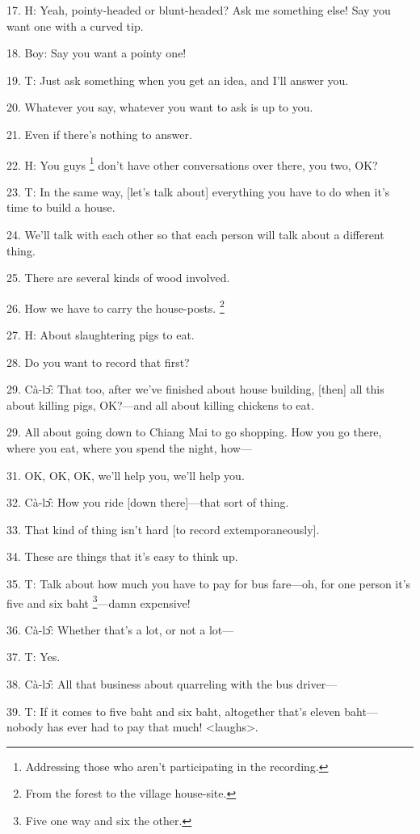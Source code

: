 17. H: Yeah, pointy-headed or blunt-headed?  Ask me something else! Say you want
one with a curved tip.

18. Boy: Say you want a pointy one!

19. T: Just ask something when you get an idea, and I'll answer you.

20. Whatever you say, whatever you want to ask is up to you.

21. Even if there's nothing to answer.

22. H: You guys \footnote{Addressing those who aren't participating in the recording.} don't have other conversations over there, you two, OK?

23. T: In the same way, [let's talk about] everything you have to do when it's
time to build a house.

24. We'll talk with each other so that each person will talk about a different
thing.

25. There are several kinds of wood involved.

26. How we have to carry the house-posts. \footnote{From the forest to the village house-site.}

27. H: About slaughtering pigs to eat.

28. Do you want to record that first?

29. Cà-lɔ̂: That too, after we've finished about house building, [then] all
this about killing pigs, OK?---and all about killing chickens to eat.

29. All about going down to Chiang Mai to go shopping. How you go there, where
you eat, where you spend the night, how---

31. OK, OK, OK, we'll help you, we'll help you.

32. Cà-lɔ̂: How you ride [down there]---that sort of thing.

33. That kind of thing isn't hard [to record extemporaneously].

34. These are things that it's easy to think up.

35. T: Talk about how much you have to pay for bus fare---oh, for one person it's
five and six baht \footnote{Five one way and six the other.}---damn expensive!

36. Cà-lɔ̂: Whether that's a lot, or not a lot---

37. T: Yes.

38. Cà-lɔ̂: All that business about quarreling with the bus driver---

39. T: If it comes to five baht and six baht, altogether that's eleven baht---nobody
has ever had to pay that much! <laughs>.

